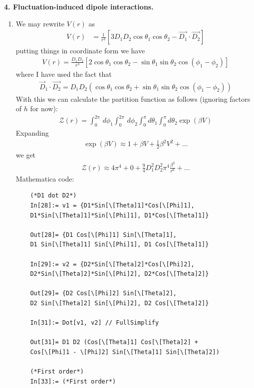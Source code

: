 \documentclass{article}
\theoremstyle{definition}
\newcommand{\be}{\beta}
\newcommand{\f}[2]{\frac{#1}{#2}}
\newcommand{\lb}{\left[}
\newcommand{\rb}{\right]}
\begin{document}
\noindent \textbf{4. Fluctuation-induced dipole interactions.}

\begin{enumerate}[label=(\alph*)]
	\item We may rewrite $V(r)$ as 
	\begin{align*}
	V(r) 
	&= \f{1}{r^3} \lb 3D_1 D_2 \cos\theta_1 \cos\theta_2  - \vec{D_1} \cdot \vec{D_2} \rb
 	\end{align*}
 	putting things in coordinate form we have
 	\begin{align*}
 	V(r) = \f{D_1 D_2}{r^3}\lb 2\cos\theta_1 \cos\theta_2 - \sin\theta_1\sin\theta_2\cos(\phi_1 - \phi_2) \rb
 	\end{align*}
 	where I have used the fact that
 	\begin{align*}
 	\vec{D}_1 \cdot \vec{D_2} = D_1D_2 (\cos\theta_1\cos\theta_2 + \sin\theta_1\sin\theta_2\cos(\phi_1-\phi_2))
 	\end{align*}
 	With this we can calculate the partition function as follows (ignoring factors of $h$ for now):
 	\begin{align*}
	\mathcal{Z}(r) = \int_0^{2\pi}\,d\phi_1 \int_0^{2\pi}\,d\phi_2 \int_0^\pi d\theta_1 \int_0^\pi d\theta_2 \exp(\be V) 
	\end{align*}
	Expanding 
	\begin{align*}
	\exp(\be V) \approx 1 + \be V + \f{1}{2}\be^2 V^2 + \dots 
	\end{align*}
	we get
	\begin{align*}
	\boxed{\mathcal{Z}(r) \approx 4\pi^4 + 0 + \f{9}{4}D_1^2D_2^2 \pi^4 \f{\beta^2}{r^6} + \dots}
	\end{align*}
	Mathematica code:
	\begin{lstlisting}
	(*D1 dot D2*)
	In[28]:= v1 = {D1*Sin[\[Theta]1]*Cos[\[Phi]1], 
	D1*Sin[\[Theta]1]*Sin[\[Phi]1], D1*Cos[\[Theta]1]}
	
	Out[28]= {D1 Cos[\[Phi]1] Sin[\[Theta]1], 
	D1 Sin[\[Theta]1] Sin[\[Phi]1], D1 Cos[\[Theta]1]}
	
	In[29]:= v2 = {D2*Sin[\[Theta]2]*Cos[\[Phi]2], 
	D2*Sin[\[Theta]2]*Sin[\[Phi]2], D2*Cos[\[Theta]2]}
	
	Out[29]= {D2 Cos[\[Phi]2] Sin[\[Theta]2], 
	D2 Sin[\[Theta]2] Sin[\[Phi]2], D2 Cos[\[Theta]2]}
	
	In[31]:= Dot[v1, v2] // FullSimplify
	
	Out[31]= D1 D2 (Cos[\[Theta]1] Cos[\[Theta]2] + 
	Cos[\[Phi]1 - \[Phi]2] Sin[\[Theta]1] Sin[\[Theta]2])
	
	(*First order*)
	In[33]:= (*First order*)
	

\end{lstlisting}
\end{enumerate}
\end{document}
